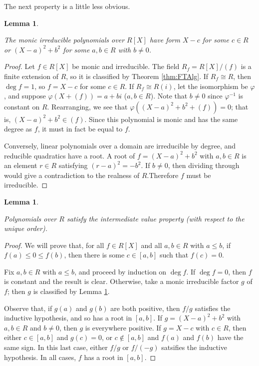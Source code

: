 \documentclass{article}
\newtheorem{lemma}[theorem]{Lemma}
\newcommand{\leanok}{}
\newcommand{\lean}[1]{}
\newcommand{\uses}[1]{}
\begin{document}
The next property is a little less obvious.

\begin{lemma}
  \label{lem:irreds_class}
  \uses{def:RCF}
  \lean{IsRealClosed.eq_linear_or_eq_sq_add_sq_of_irreducible}
  \leanok
  The monic irreducible polynomials over $R[X]$ have form $X-c$ for some $c\in R$ or $(X-a)^2+b^2$ for some $a,b\in R$ with $b\neq0$.
\end{lemma}
\begin{proof}
  \uses{thm:FTAlg}
  \leanok
  Let $f\in R[X]$ be monic and irreducible. The field $R_f=R[X]/(f)$ is a finite extension of $R$, so it is classified by Theorem \ref{thm:FTAlg}. If $R_f\cong R$, then $\deg f=1$, so $f=X-c$ for some $c\in R$. If $R_f\cong R(i)$, let the isomorphism be $\varphi$, and suppose $\varphi(X+(f))=a+bi$ ($a,b\in R$). Note that $b\neq0$ since $\varphi^{-1}$ is constant on $R$. Rearranging, we see that $\varphi((X-a)^2+b^2+(f))=0$; that is, $(X-a)^2+b^2\in(f)$. Since this polynomial is monic and has the same degree as $f$, it must in fact be equal to $f$.

  Conversely, linear polynomials over a domain are irreducible by degree, and reducible quadratics have a root. A root of $f=(X-a)^2+b^2$ with $a,b\in R$ is an element $r\in R$ satisfying $(r-a)^2=-b^2$. If $b\neq0$, then dividing through would give a contradiction to the realness of $R$.Therefore $f$ must be irreducible.
\end{proof}

\begin{lemma}
  \label{lem:IVP_poly}
  \uses{def:RCF, lem:RCF_ord_unique}
  \lean{IsRealClosed.exists_isRoot_of_nonpos_of_nonneg}
  \leanok
  Polynomials over $R$ satisfy the intermediate value property (with respect to the unique order).
\end{lemma}
\begin{proof}
  \uses{lem:irreds_class}
  \leanok
  We will prove that, for all $f\in R[X]$ and all $a,b\in R$ with $a\leq b$, if $f(a)\leq 0\leq f(b)$, then there is some $c\in[a,b]$ such that $f(c)=0$.

  Fix $a,b\in R$ with $a\leq b$, and proceed by induction on $\deg f$. If $\deg f=0$, then $f$ is constant and the result is clear. Otherwise, take a monic irreducible factor $g$ of $f$; then $g$ is classified by Lemma \ref{lem:irreds_class}.

  Observe that, if $g(a)$ and $g(b)$ are both positive, then $f/g$ satisfies the inductive hypothesis, and so has a root in $[a,b]$. If $g=(X-a)^2+b^2$ with $a,b\in R$ and $b\neq0$, then $g$ is everywhere positive. If $g=X-c$ with $c\in R$, then either $c\in[a,b]$ and $g(c)=0$, or $c\notin[a,b]$ and $f(a)$ and $f(b)$ have the same sign. In this last case, either $f/g$ or $f/(-g)$ satsifies the inductive hypothesis. In all cases, $f$ has a root in $[a,b]$.
\end{proof}
\end{document}
